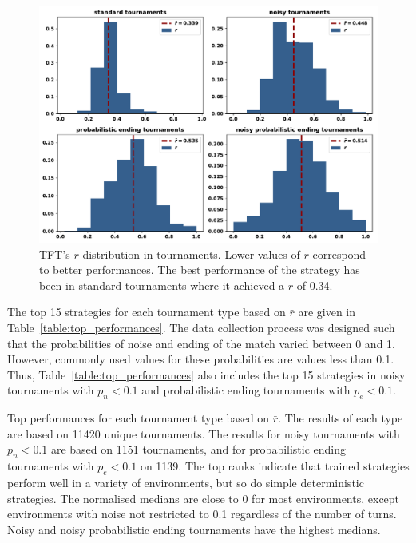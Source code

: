 \documentclass{article}
\begin{document}
\begin{figure}[!htbp]
    \centering
    \includegraphics[width=.8\textwidth]{../images/tit_for_tat_r_distributions.pdf}
    \caption{TFT's $r$ distribution in tournaments. Lower values of \(r\)
    correspond to better performances. The best performance
    of the strategy has been in standard tournaments where it achieved a $\bar{r}$
    of 0.34.}
    \label{fig:tit_for_tat_r_distribution}
\end{figure}

The top 15 strategies for each tournament type based on \(\bar{r}\) are given in
Table~\ref{table:top_performances}. The data collection process was designed such
that the probabilities of noise and ending of the match varied between 0 and
1. However, commonly used values for these probabilities are values less than 0.1.
Thus,
Table~\ref{table:top_performances} also includes the top 15 strategies in noisy
tournaments with \(p_n < 0.1\) and probabilistic ending tournaments with \(p_e <
0.1\).

\begin{table}[!htbp]
    \begin{center}
    \resizebox{\textwidth}{!}{
        
    }
\end{center}
\caption{Top performances for each tournament type based on $\bar{r}$. The
results of each type are based on 11420 unique tournaments. The
results for noisy tournaments with \(p_n < 0.1\) are based on 1151 tournaments,
and for probabilistic ending tournaments with \(p_e < 0.1\) on 1139. The top
ranks indicate that trained strategies perform well in a variety of
environments, but so do simple deterministic strategies. The normalised medians
are close to 0 for most environments, except environments with noise not
restricted to 0.1 regardless of the number of turns. Noisy and noisy probabilistic
ending tournaments have the highest medians.}
\label{table:top_performances}
\end{table}
\end{document}
